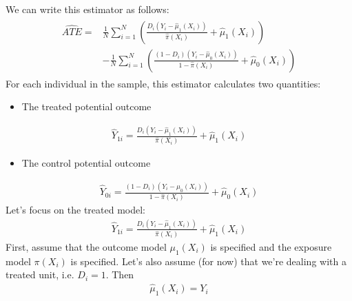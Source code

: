 \documentclass[letterpaper,10pt,english]{jupyterBook}
\begin{document}
\sphinxAtStartPar
We can write this estimator as follows:
\begin{equation*}
\begin{split}\begin{aligned}
\widehat{ATE} = &\frac{1}{N} \sum_{i=1}^N \left( \frac{D_i(Y_i - \hat \mu_1 (X_i))}{\hat \pi (X_i)} + \hat \mu_1(X_i) \right) \\
&- \frac{1}{N} \sum_{i=1}^N \left( \frac{(1-D_i)(Y_i - \hat \mu_0 (X_i))}{1-\hat \pi(X_i)} + \hat \mu_0(X_i) \right)
\end{aligned}\end{split}
\end{equation*}
\sphinxAtStartPar
For each individual in the sample, this estimator calculates two quantities:
\begin{itemize}
\item {} 
\sphinxAtStartPar
The treated potential outcome

\end{itemize}
\begin{equation*}
\begin{split}\hat Y_{1i} = \frac{D_i(Y_i - \hat \mu_1 (X_i))}{\hat \pi (X_i)} + \hat \mu_1(X_i)\end{split}
\end{equation*}\begin{itemize}
\item {} 
\sphinxAtStartPar
The control potential outcome

\end{itemize}
\begin{equation*}
\begin{split}\hat Y_{0i} = \frac{(1-D_i)(Y_i - \hat \mu_0 (X_i))}{1-\hat \pi(X_i)} + \hat \mu_0(X_i)\end{split}
\end{equation*}
\sphinxAtStartPar
Let’s focus on the treated model:
\begin{equation*}
\begin{split}\hat Y_{1i} = \frac{D_i(Y_i - \hat \mu_1 (X_i))}{\hat \pi (X_i)} + \hat \mu_1(X_i)\end{split}
\end{equation*}
\sphinxAtStartPar
First, assume that the outcome model \(\mu_1(X_i)\) is  specified and the exposure model \(\pi(X_i)\) is  specified. Let’s also assume (for now) that we’re dealing with a treated unit, i.e. \(D_i = 1\). Then
\begin{equation*}
\begin{split}\hat \mu_1 (X_i) = Y_i\end{split}
\end{equation*}
\end{document}
